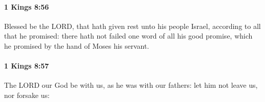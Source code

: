 		\paragraph{1 Kings 8:56} %
			\label{1KINGS-8-56}

			Blessed be the LORD, that hath given rest unto his people Israel, according to all that he promised: there hath not failed one word of all his good promise, which he promised by the hand of Moses his servant.


		\paragraph{1 Kings 8:57} %
			\label{1KINGS-8-57}

			The LORD our God be with us, as he was with our fathers: let him not leave us, nor forsake us:


